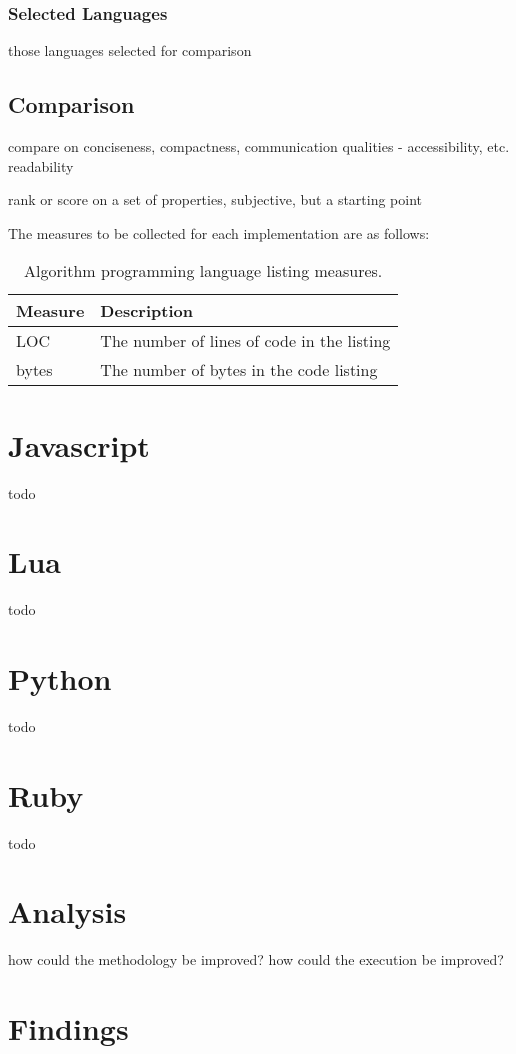 \documentclass[a4paper, 11pt]{article}
\begin{document}
\subsubsection{Selected Languages}
\label{subsubsec:selection}
those languages selected for comparison


% 
% 
\subsection{Comparison}
compare on conciseness, compactness, communication qualities - accessibility, etc. readability

rank or score on a set of properties, subjective, but a starting point

The measures to be collected for each implementation are as follows:

\begin{table}[ht]
	\centering
		\begin{tabularx}{\textwidth}{lX}
		\toprule
		\textbf{Measure} & \textbf{Description} \\ 
		\toprule
		LOC & The number of lines of code in the listing \\
		bytes & The number of bytes in the code listing \\
		\bottomrule
		\end{tabularx}	
	\caption{Algorithm programming language listing measures.}
	\label{tab:measures}
\end{table}


% 
% 
\section{Javascript}
\label{sec:javascript}
todo


% 
% 
\section{Lua}
\label{sec:lua}
todo


% 
% 
\section{Python}
\label{sec:python}
todo


% 
% 
\section{Ruby}
\label{sec:ruby}
todo


% 
% 
\section{Analysis}
\label{sec:analysis}

how could the methodology be improved?
how could the execution be improved?


% 
% 
\section{Findings}
\label{sec:findings}






\end{document}
